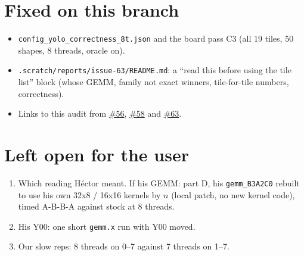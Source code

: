\documentclass[10pt,a4paper]{article}
\newcommand{\iss}[1]{\href{https://github.com/JieGH/RVV_code_gen_via_MLIR_xDSL/issues/#1}{\##1}}
\begin{document}
\section*{Fixed on this branch}
\begin{itemize}
\item \texttt{config\_yolo\_correctness\_8t.json} and the board pass C3 (all 19 tiles, 50 shapes, 8 threads, oracle on).
\item \texttt{.scratch/reports/issue-63/README.md}: a ``read this before using the tile list'' block (whose GEMM, family
not exact winners, tile-for-tile numbers, correctness).
\item Links to this audit from \iss{56}, \iss{58} and \iss{63}.
\end{itemize}

\section*{Left open for the user}
\begin{enumerate}
\item Which reading H\'ector meant. If his GEMM: part D, his \texttt{gemm\_B3A2C0} rebuilt to use his own 32x8 /
16x16 kernels by $n$ (local patch, no new kernel code), timed A-B-B-A against stock at 8 threads.
\item His Y00: one short \texttt{gemm.x} run with Y00 moved.
\item Our slow reps: 8 threads on 0--7 against 7 threads on 1--7.
\end{enumerate}
\end{document}
